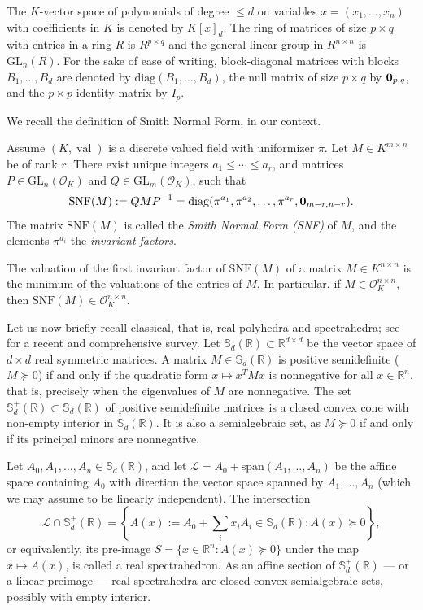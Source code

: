 \documentclass{elsarticle}
\theoremstyle{plain}
\theoremstyle{definition}
\newcommand{\R}{\mathbb{R}} %
\newcommand{\sym}{\mathbb{S}} %
\renewcommand{\span}[1]{{\mathrm{span}(#1)}} %
\newcommand{\calL}{\mathcal{L}} %
\DeclareMathOperator{\val}{val}
\newcommand{\OK}{\mathcal{O}_K}
\def\diag{\mathrm{diag}}
\newcommand{\GL}{\mathrm{GL}}
\begin{document}
The $K$-vector space of polynomials of degree $\leq d$ on variables
$x=(x_1,\ldots,x_n)$
with coefficients in $K$ is denoted by $K[x]_{d}$. The ring of matrices of
size $p \times q$ with entries in a ring $R$ is $R^{p \times q}$ and the general
linear group in $R^{n \times n}$ is $\GL_n(R)$.
For the sake of ease of writing, block-diagonal matrices with blocks
$B_1,\ldots,B_d$ are denoted by $\diag(B_1, \ldots, B_d)$, the null matrix of
size $p \times q$ by ${\bf 0}_{p,q}$, and the $p \times p$ identity matrix by $I_p$.

We recall the definition of Smith Normal Form, in our context.

\begin{definition}\label{smith_nf}
  Assume $(K,\val)$ is a discrete valued field with uniformizer $\pi$.
  Let $M \in K^{m \times n}$ be of rank $r$. There exist unique integers
  $a_1 \leq \cdots \leq a_r$, and
  matrices $P \in \GL_n(\OK)$ and $Q \in \GL_m(\OK)$, such that
  $$
  \mathrm{SNF}(M) := QMP^{-1} = \diag(\pi^{a_1}, \pi^{a_2}, \ldots, \pi^{a_r}, {\bf 0}_{m-r,n-r}).
  $$
  The matrix $\mathrm{SNF}(M)$ is called the \emph{Smith Normal Form (SNF)} of $M$, and the elements $\pi^{a_i}$ the
  \emph{invariant factors}.
\end{definition}
\begin{remark}
  The valuation of the first invariant factor of $\mathrm{SNF}(M)$ of a matrix
  $M \in K^{n \times n}$ is the minimum of the valuations of the entries of
  $M$. In particular, if $M \in \OK^{n \times n}$, then $\mathrm{SNF}(M) \in \OK^{n \times n}$.
\end{remark}

Let us now briefly recall classical, that is, real polyhedra and spectrahedra;
see \cite{netzer2023geometry} for a recent and comprehensive survey.
Let $\sym_d(\R) \subset \R^{d\times d}$ be the vector space of $d \times d$ real symmetric
matrices. A matrix $M \in \sym_d(\R)$ is {positive semidefinite} ($M \succeq 0$) if and only if
 the quadratic form $x \mapsto x^TMx$ is nonnegative for all $x\in \R^n$, that is, precisely when
  the eigenvalues of $M$ are nonnegative. The set $\sym_d^+(\R) \subset \sym_d(\R)$ of positive 
  semidefinite matrices is a closed convex cone with non-empty interior in $\sym_d(\R)$. 
  It is also a semialgebraic set, as $M \succeq 0$ if and only if its principal minors are nonnegative.

Let $A_0,A_1,\ldots,A_n \in \sym_d(\R)$, and let $\calL = A_0+\span{A_1,\ldots,A_n}$ be the affine space
containing $A_0$ with direction the vector space spanned by $A_1,\ldots,A_n$ (which we may assume
to be linearly independent). The intersection
$$
\calL \cap \sym_d^+(\R) = \left\{A(x) := A_0+\sum_i x_i A_i \in \sym_d(\R) :
A(x) \succeq 0\right\},
$$
or equivalently, its pre-image $S = \{x \in \R^n : A(x) \succeq 0\}$ under the map $x \mapsto A(x)$, is called
a {real spectrahedron}. As an affine section of $\sym_d^+(\R)$ --- or a linear preimage --- real spectrahedra
are closed convex semialgebraic sets, possibly with empty interior.
\end{document}
